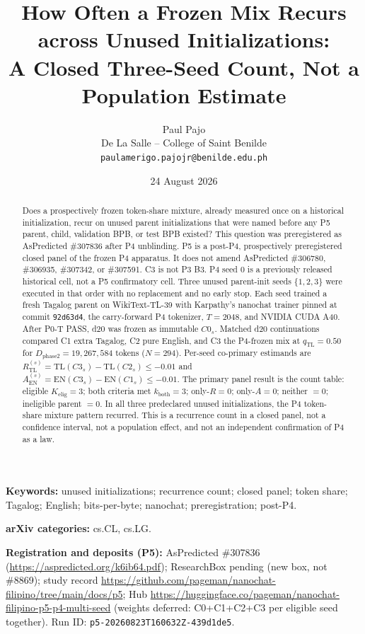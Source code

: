 \documentclass[11pt,a4paper]{article}
\title{How Often a Frozen Mix Recurs across Unused Initializations:\\
\large A Closed Three-Seed Count, Not a Population Estimate}
\author{Paul Pajo\\
De La Salle -- College of Saint Benilde\\
\texttt{paulamerigo.pajojr@benilde.edu.ph}}
\date{24 August 2026}
\begin{document}
\maketitle

\begin{abstract}
Does a prospectively frozen token-share mixture, already measured once on a historical initialization, recur on unused parent initializations that were named before any P5 parent, child, validation BPB, or test BPB existed? This question was preregistered as AsPredicted \#307836 after P4 unblinding. P5 is a post-P4, prospectively preregistered closed panel of the frozen P4 apparatus. It does not amend AsPredicted \#306780, \#306935, \#307342, or \#307591. C3 is not P3 B3. P4 seed 0 is a previously released historical cell, not a P5 confirmatory cell. Three unused parent-init seeds $\{1,2,3\}$ were executed in that order with no replacement and no early stop. Each seed trained a fresh Tagalog parent on WikiText-TL-39 with Karpathy's nanochat trainer pinned at commit \texttt{92d63d4}, the carry-forward P4 tokenizer, $T=2048$, and NVIDIA CUDA A40. After P0-T PASS, d20 was frozen as immutable $C0_s$. Matched d20 continuations compared C1 extra Tagalog, C2 pure English, and C3 the P4-frozen mix at $q_{\mathrm{TL}}=0.50$ for $D_{\mathrm{phase2}}=19{,}267{,}584$ tokens ($N=294$). Per-seed co-primary estimands are $R_{\mathrm{TL}}^{(s)}=\mathrm{TL}(C3_s)-\mathrm{TL}(C2_s)\le -0.01$ and $A_{\mathrm{EN}}^{(s)}=\mathrm{EN}(C3_s)-\mathrm{EN}(C1_s)\le -0.01$. The primary panel result is the count table: eligible $K_{\mathrm{elig}}=3$; both criteria met $k_{\mathrm{both}}=3$; only-$R=0$; only-$A=0$; neither $=0$; ineligible parent $=0$. In all three predeclared unused initializations, the P4 token-share mixture pattern recurred. This is a recurrence count in a closed panel, not a confidence interval, not a population effect, and not an independent confirmation of P4 as a law.
\end{abstract}

\noindent\textbf{Keywords:} unused initializations; recurrence count; closed panel; token share; Tagalog; English; bits-per-byte; nanochat; preregistration; post-P4.

\noindent\textbf{arXiv categories:} cs.CL, cs.LG.

\noindent\textbf{Registration and deposits (P5):} AsPredicted \#307836 (\url{https://aspredicted.org/k6ib64.pdf}); ResearchBox pending (new box, not \#8869); study record \url{https://github.com/pageman/nanochat-filipino/tree/main/docs/p5}; Hub \url{https://huggingface.co/pageman/nanochat-filipino-p5-p4-multi-seed} (weights deferred: C0+C1+C2+C3 per eligible seed together). Run ID: \texttt{p5-20260823T160632Z-439d1de5}.
\end{document}
